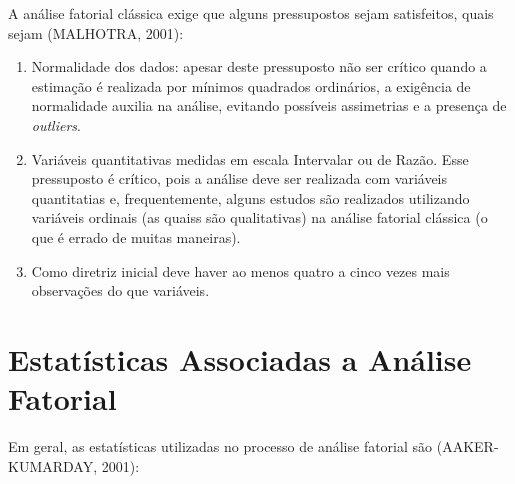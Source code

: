 \documentclass[12pt,brazil,]{book}
\begin{document}
A análise fatorial clássica exige que alguns pressupostos sejam
satisfeitos, quais sejam (MALHOTRA, 2001):

\begin{enumerate}
\def\labelenumi{\alph{enumi}.}
\item
  Normalidade dos dados: apesar deste pressuposto não ser crítico quando
  a estimação é realizada por mínimos quadrados ordinários, a exigência
  de normalidade auxilia na análise, evitando possíveis assimetrias e a
  presença de \emph{outliers}.
\item
  Variáveis quantitativas medidas em escala Intervalar ou de Razão. Esse
  pressuposto é crítico, pois a análise deve ser realizada com variáveis
  quantitatias e, frequentemente, alguns estudos são realizados
  utilizando variáveis ordinais (as quaiss são qualitativas) na análise
  fatorial clássica (o que é errado de muitas maneiras).
\item
  Como diretriz inicial deve haver ao menos quatro a cinco vezes mais
  observações do que variáveis.
\end{enumerate}

\hypertarget{estatisticas-associadas-a-analise-fatorial}{%
\section{Estatísticas Associadas a Análise
Fatorial}\label{estatisticas-associadas-a-analise-fatorial}}

Em geral, as estatísticas utilizadas no processo de análise fatorial são
(AAKER-KUMARDAY, 2001):
\end{document}
